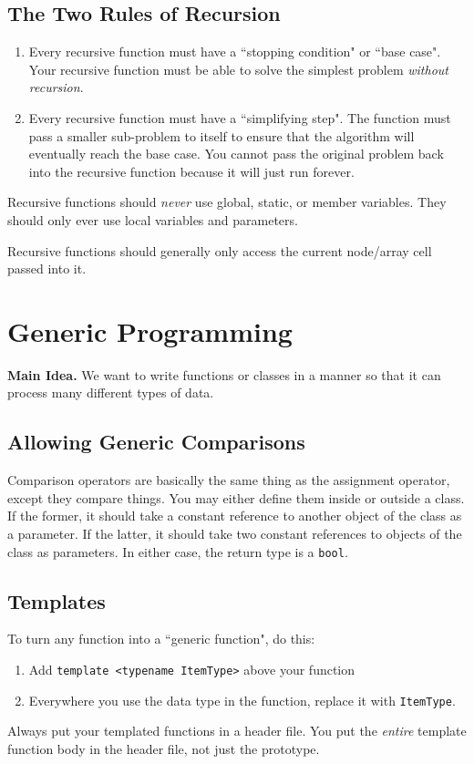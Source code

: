 \documentclass[class=article, crop=false]{standalone}
\begin{document}
  \subsection{The Two Rules of Recursion}
  \begin{enumerate}
    \item Every recursive function must have a ``stopping condition" or ``base case". Your recursive function must be able to solve the simplest problem \emph{without recursion}.
    \item Every recursive function must have a ``simplifying step". The function must pass a smaller sub-problem to itself to ensure that the algorithm will eventually reach the base case. You cannot pass the original problem back into the recursive function because it will just run forever.
  \end{enumerate}
  \begin{note}{}
    Recursive functions should \emph{never} use global, static, or member variables. They should only ever use local variables and parameters.
  \end{note}
  Recursive functions should generally only access the current node/array cell passed into it.
  \section{Generic Programming}
  \textbf{Main Idea.} We want to write functions or classes in a manner so that it can process many different types of data.
  \subsection{Allowing Generic Comparisons}
  Comparison operators are basically the same thing as the assignment operator, except they compare things. You may either define them inside or outside a class. If the former, it should take a constant reference to another object of the class as a parameter. If the latter, it should take two constant references to objects of the class as parameters. In either case, the return type is a \texttt{bool}.
  \subsection{Templates}
  To turn any function into a ``generic function", do this:
  \begin{enumerate}
    \item Add \texttt{template <typename ItemType>} above your function
    \item Everywhere you use the data type in the function, replace it with \texttt{ItemType}.
  \end{enumerate}
  \begin{note}{}
    Always put your templated functions in a header file. You put the \emph{entire} template function body in the header file, not just the prototype.
  \end{note}
\end{document}
